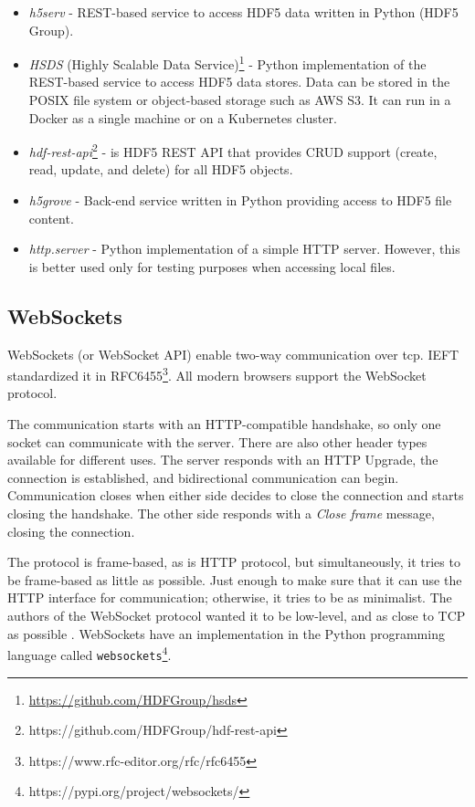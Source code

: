 \begin{itemize}
    \item \emph{h5serv} - REST-based service to access HDF5 data written in Python (HDF5 Group).
    \item \emph{HSDS} (Highly Scalable Data Service)\footnote{\url{https://github.com/HDFGroup/hsds}} - Python implementation of the REST-based service to access HDF5 data stores. Data can be stored in the POSIX file system or object-based storage such as AWS S3. It can run in a Docker as a single machine or on a Kubernetes cluster.
    \item \emph{hdf-rest-api}\footnote{https://github.com/HDFGroup/hdf-rest-api} - is HDF5 REST API that provides CRUD support (create, read, update, and delete) for all HDF5 objects.
    \item \emph{h5grove} - Back-end service written in Python providing access to HDF5 file content.
    \item \emph{http.server} - Python implementation of a simple HTTP server. However, this is better used only for testing purposes when accessing local files.
\end{itemize}


\subsection{WebSockets}\label{txt.design.websocket}

WebSockets (or WebSocket API) enable two-way communication over \ac{tcp}. IEFT standardized it in RFC6455\footnote{https://www.rfc-editor.org/rfc/rfc6455}. All modern browsers support the WebSocket protocol.

The communication starts with an HTTP-compatible handshake, so only one socket can communicate with the server. There are also other header types available for different uses. The server responds with an HTTP Upgrade, the connection is established, and bidirectional communication can begin. Communication closes when either side decides to close the connection and starts closing the handshake. The other side responds with a \textit{Close frame} message, closing the connection. 

The protocol is frame-based, as is HTTP protocol, but simultaneously, it tries to be frame-based as little as possible. Just enough to make sure that it can use the HTTP interface for communication; otherwise, it tries to be as minimalist. The authors of the WebSocket protocol wanted it to be low-level, and as close to TCP as possible \cite{websock}. WebSockets have an implementation in the Python programming language called \verb|websockets|\footnote{https://pypi.org/project/websockets/}.

